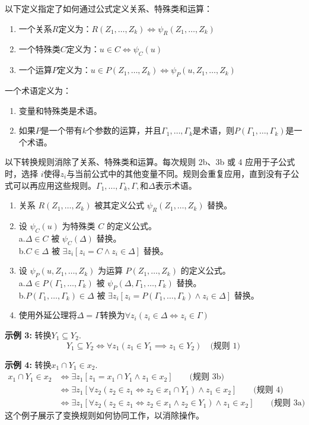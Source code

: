 以下定义指定了如何通过公式定义关系、特殊类和运算：
\begin{enumerate}
\item 一个关系\( R \)定义为：\(R(Z_1, \dots, Z_k) \iff \psi_R(Z_1, \dots, Z_k)\)
\item 一个特殊类\( C \)定义为：\(u \in C \iff \psi_C(u)\)
\item 一个运算\( P \)定义为：\(u \in P(Z_1, \dots, Z_k) \iff \psi_P(u, Z_1, \dots, Z_k)\)
\end{enumerate}
一个术语定义为：
\begin{enumerate}
\item 变量和特殊类是术语。
\item 如果\( P \)是一个带有\( k \)个参数的运算，并且\( \Gamma_1, \dots, \Gamma_k \)是术语，则\( P(\Gamma_1, \dots, \Gamma_k) \)是一个术语。
\end{enumerate}
以下转换规则消除了关系、特殊类和运算。每次规则 2b、3b 或 4 应用于子公式时，选择 \( i \)使得\( z_i \)与当前公式中的其他变量不同。规则会重复应用，直到没有子公式可以再应用这些规则。\( \Gamma_1, \dots, \Gamma_k, \Gamma, \)和\( \Delta \)表示术语。
\begin{enumerate}
\item 关系 \( R(Z_1, \dots, Z_k) \) 被其定义公式 \( \psi_R(Z_1, \dots, Z_k) \) 替换。
\item 设 \( \psi_C(u) \) 为特殊类 \( C \) 的定义公式。\\  
   a.\( \Delta \in C \) 被 \( \psi_C(\Delta) \) 替换。\\  
   b.\( C \in \Delta \) 被 \( \exists z_i [z_i = C \land z_i \in \Delta] \) 替换。
\item 设 \( \psi_P(u, Z_1, \dots, Z_k) \) 为运算 \( P(Z_1, \dots, Z_k) \) 的定义公式。\\  
   a.\( \Delta \in P(\Gamma_1, \dots, \Gamma_k) \) 被 \( \psi_P(\Delta, \Gamma_1, \dots, \Gamma_k) \) 替换。\\  
   b.\( P(\Gamma_1, \dots, \Gamma_k) \in \Delta \) 被 \( \exists z_i [z_i = P(\Gamma_1, \dots, \Gamma_k) \land z_i \in \Delta] \) 替换。
\item 使用外延公理将\( \Delta = \Gamma \)转换为\(\forall z_i (z_i \in \Delta \iff z_i \in \Gamma)\)
\end{enumerate}

\textbf{示例 3:} 转换\( Y_1 \subseteq Y_2 \).
\[
Y_1 \subseteq Y_2 \iff \forall z_1 (z_1 \in Y_1 \implies z_1 \in Y_2) \quad \text{(规则 1)}~
\]

\textbf{示例 4:} 转换\( x_1 \cap Y_1 \in x_2 \).
\[
\begin{aligned}
x_1 \cap Y_1 \in x_2 &\iff \exists z_1 [z_1 = x_1 \cap Y_1 \land z_1 \in x_2]  \qquad \text{(规则 3b)}\\
&\iff \exists z_1 [\forall z_2 (z_2 \in z_1 \iff z_2 \in x_1 \cap Y_1) \land z_1 \in x_2] \qquad \text{(规则 4)}\\
&\iff \exists z_1 [\forall z_2 (z_2 \in z_1 \iff z_2 \in x_1 \land z_2 \in Y_1) \land z_1 \in x_2] \qquad \text{(规则 3a)}
\end{aligned}~
\]
这个例子展示了变换规则如何协同工作，以消除操作。

